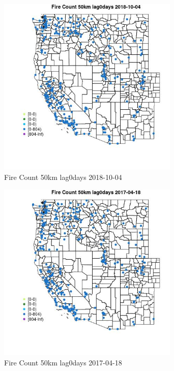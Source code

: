 \begin{figure} 
\centering  
\includegraphics[width=0.77\textwidth]{Code_Outputs/Report_ML_input_PM25_Step4_part_f_de_duplicated_aveswNAs_MapObsFire_Count_50km_lag0days2018-10-04.jpg} 
\caption{\label{fig:Report_ML_input_PM25_Step4_part_f_de_duplicated_aveswNAsMapObsFire_Count_50km_lag0days2018-10-04}Fire Count 50km lag0days 2018-10-04} 
\end{figure} 
 

\begin{figure} 
\centering  
\includegraphics[width=0.77\textwidth]{Code_Outputs/Report_ML_input_PM25_Step4_part_f_de_duplicated_aveswNAs_MapObsFire_Count_50km_lag0days2017-04-18.jpg} 
\caption{\label{fig:Report_ML_input_PM25_Step4_part_f_de_duplicated_aveswNAsMapObsFire_Count_50km_lag0days2017-04-18}Fire Count 50km lag0days 2017-04-18} 
\end{figure} 
 

